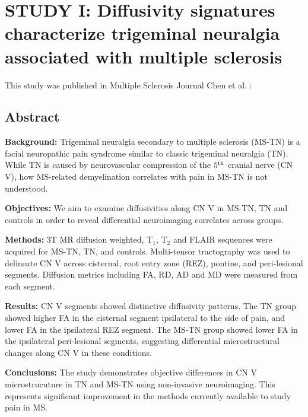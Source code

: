 \graphicspath{{images/mspaper/drafts/}}

\chapter{STUDY I: Diffusivity signatures characterize trigeminal neuralgia associated with multiple sclerosis}
\label{section:study1}

This study was published in Multiple Sclerosis Journal  Chen et al. :



\section{Abstract}
\textbf{Background: }Trigeminal neuralgia secondary to multiple sclerosis (MS-TN) is a facial neuropathic pain syndrome similar to classic trigeminal neuralgia (TN). While TN is caused by neurovascular compression of the $5\textsuperscript{th}$ cranial nerve (CN V), how MS-related demyelination correlates with pain in MS-TN is not understood. 

\textbf{Objectives: }We aim to examine diffusivities along CN V in MS-TN, TN and controls in order to reveal differential neuroimaging correlates across groups.

\textbf{Methods: }3T MR diffusion weighted, T$_{1}$, T$_{2}$ and FLAIR sequences were acquired for MS-TN, TN, and controls. Multi-tensor tractography was used to delineate CN V across cisternal, root entry zone (REZ), pontine, and peri-lesional segments. Diffusion metrics including FA, RD, AD and MD were measured from each segment. 

\textbf{Results:} CN V segments showed distinctive diffusivity patterns. The TN group showed higher FA in the cisternal segment ipsilateral to the side of pain, and lower FA in the ipsilateral REZ segment. The MS-TN group showed lower FA in the ipsilateral peri-lesional segments,  suggesting differential microstructural changes along CN V in these conditions. 

\textbf{Conclusions:} The study demonstrates objective differences in CN V microstrucuture in TN and MS-TN using non-invasive neuroimaging. This represents significant improvement in the methods currently available to study pain in MS. 

